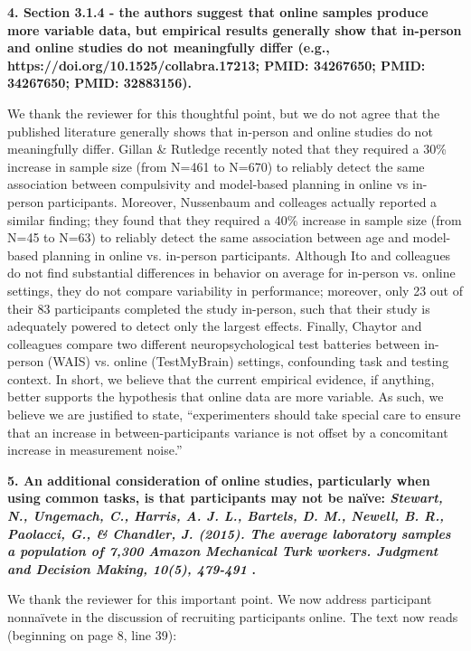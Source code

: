 \documentclass[a4paper,12pt]{article}
\begin{document}
\textbf{4. Section 3.1.4 - the authors suggest that online samples produce more variable data, but empirical results generally show that in-person and online studies do not meaningfully differ (e.g., https://doi.org/10.1525/collabra.17213; PMID: 34267650; PMID: 34267650; PMID: 32883156). \cite{nussenbaum2020moving, ito2021validating, chaytor2021construct}}

We thank the reviewer for this thoughtful point, but we do not agree that the published literature generally shows that in-person and online studies do not meaningfully differ. Gillan \& Rutledge \cite{gillan2021smartphones} recently noted that they required a 30\% increase in sample size (from N=461 to N=670) to reliably detect the same association between compulsivity and model-based planning in online vs in-person participants. Moreover, Nussenbaum and colleages \cite{nussenbaum2020moving} actually reported a similar finding; they found that they required a 40\% increase in sample size (from N=45 to N=63) to reliably detect the same association between age and model-based planning in online vs. in-person participants. Although Ito and colleagues \cite{ito2021validating} do not find substantial differences in behavior on average for in-person vs. online settings, they do not compare variability in performance; moreover, only 23 out of their 83 participants completed the study in-person, such that their study is adequately powered to detect only the largest effects. Finally, Chaytor and colleagues \cite{chaytor2021construct} compare two different neuropsychological test batteries between in-person (WAIS) vs. online (TestMyBrain) settings, confounding task and testing context. In short, we believe that the current empirical evidence, if anything, better supports the hypothesis that online data are more variable. As such, we believe we are justified to state, ``experimenters should take special care to ensure that an increase in between-participants variance is not offset by a concomitant increase in measurement noise.''

\textbf{5. An additional consideration of online studies, particularly when using common tasks, is that participants may not be naïve: \textit{Stewart, N., Ungemach, C., Harris, A. J. L., Bartels, D. M., Newell, B. R., Paolacci, G., \& Chandler, J. (2015). The average laboratory samples a population of 7,300 Amazon Mechanical Turk workers. Judgment and Decision Making, 10(5), 479-491} \cite{stewart2015average}.}

We thank the reviewer for this important point. We now address participant nonna\"ivete in the discussion of recruiting participants online. The text now reads (beginning on page 8, line 39):
\end{document}
